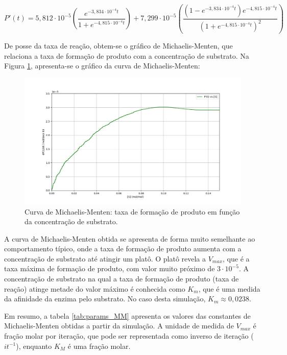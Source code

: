 \documentclass[12pt,oneside]{report}
\begin{document}
\begin{equation}
    P'(t) = 5{,}812 \cdot 10^{-5} \left(\frac{e^{-3{,}834 \cdot 10^{-4} t}}{1 + e^{-4{,}815 \cdot 10^{-4} t}}\right) + 7{,}299 \cdot 10^{-5} \left(\frac{(1 - e^{-3{,}834 \cdot 10^{-4} t}) e^{-4{,}815 \cdot 10^{-4} t}}{(1 + e^{-4{,}815 \cdot 10^{-4} t})^2}\right)
\end{equation}

De posse da taxa de reação, obtem-se o gráfico de Michaelis-Menten, que relaciona a taxa de formação de produto com a concentração de substrato. Na Figura \ref{fig:MM_curve}, apresenta-se o gráfico da curva de Michaelis-Menten:

\begin{figure}[H]
    \centering
    \includegraphics[width=1\textwidth]{img/MM_curve.png}
    \caption{\small Curva de Michaelis-Menten: taxa de formação de produto em função da concentração de substrato.}
    \label{fig:MM_curve}
\end{figure}

A curva de Michaelis-Menten obtida se apresenta de forma muito semelhante ao comportamento típico, onde a taxa de formação de produto aumenta com a concentração de substrato até atingir um platô. O platô revela a $V_{max}$, que é a taxa máxima de formação de produto, com valor muito próximo de $3 \cdot 10^{-5}$. A concentração de substrato na qual a taxa de formação de produto (taxa de reação) atinge metade do valor máximo é conhecida como $K_m$, que é uma medida da afinidade da enzima pelo substrato. No caso desta simulação, $K_m \approx 0{,}0238$.

Em resumo, a tabela \ref{tab:params_MM} apresenta os valores das constantes de Michaelis-Menten obtidas a partir da simulação. A unidade de medida de $V_{max}$ é fração molar por iteração, que pode ser representada como inverso de iteração ($it^{-1}$), enquanto $K_M$ é uma fração molar.
\end{document}
